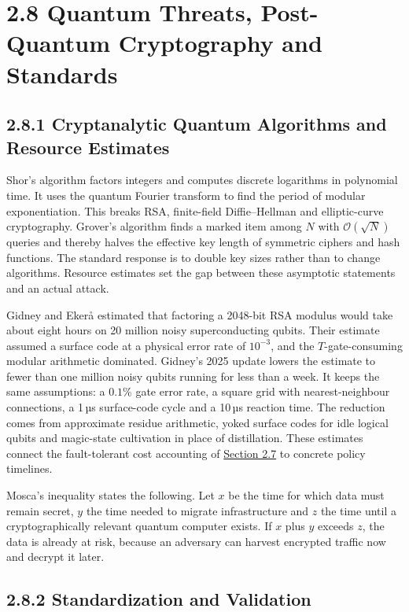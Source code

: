 \documentclass{report}
\theoremstyle{plain}
\theoremstyle{definition}
\theoremstyle{remark}
\newcommand{\bigO}[1]{\mathcal{O}\!\left(#1\right)}
\begin{document}
\section{2.8 Quantum Threats, Post-Quantum Cryptography and Standards}\label{sec:bg:crypto}

\subsection{2.8.1 Cryptanalytic Quantum Algorithms and Resource Estimates}

Shor's algorithm \cite{shor1997factoring} factors integers and computes discrete logarithms in polynomial time. It uses the quantum Fourier transform to find the period of modular exponentiation. This breaks RSA, finite-field Diffie--Hellman and elliptic-curve cryptography. Grover's algorithm \cite{grover1996search} finds a marked item among $N$ with $\bigO{\sqrt{N}}$ queries and thereby halves the effective key length of symmetric ciphers and hash functions. The standard response is to double key sizes rather than to change algorithms. Resource estimates set the gap between these asymptotic statements and an actual attack.

Gidney and Eker{\aa} \cite{gidney2021rsa} estimated that factoring a 2048-bit RSA modulus would take about eight hours on 20 million noisy superconducting qubits. Their estimate assumed a surface code at a physical error rate of $10^{-3}$, and the $T$-gate-consuming modular arithmetic dominated. Gidney's 2025 update \cite{gidney2025million} lowers the estimate to fewer than one million noisy qubits running for less than a week. It keeps the same assumptions: a $0.1\%$ gate error rate, a square grid with nearest-neighbour connections, a 1 µs surface-code cycle and a 10 µs reaction time. The reduction comes from approximate residue arithmetic, yoked surface codes for idle logical qubits and magic-state cultivation in place of distillation. These estimates connect the fault-tolerant cost accounting of \hyperref[sec:bg:qec]{Section 2.7} to concrete policy timelines.

Mosca's inequality \cite{mosca2018cybersecurity} states the following. Let $x$ be the time for which data must remain secret, $y$ the time needed to migrate infrastructure and $z$ the time until a cryptographically relevant quantum computer exists. If $x$ plus $y$ exceeds $z$, the data is already at risk, because an adversary can harvest encrypted traffic now and decrypt it later.

\subsection{2.8.2 Standardization and Validation}
\end{document}
